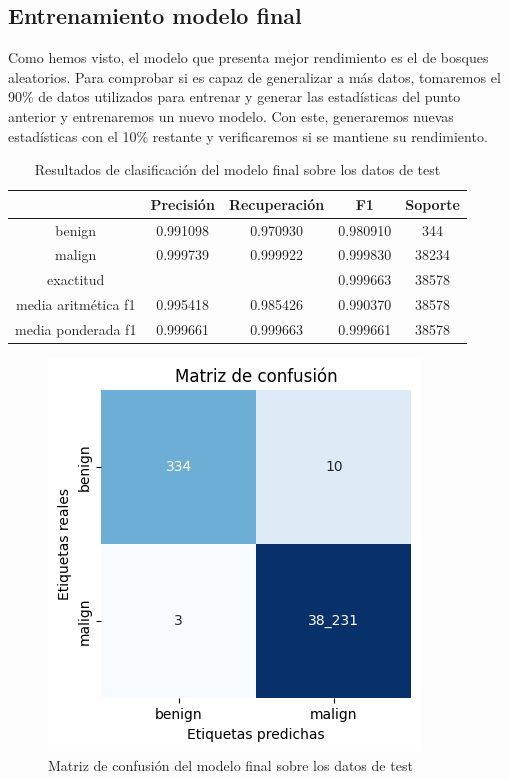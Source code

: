 \subsection{Entrenamiento modelo final}

Como hemos visto, el modelo que presenta mejor rendimiento es el de bosques aleatorios. Para comprobar si es capaz de generalizar a más datos, tomaremos el 90\% de datos utilizados para entrenar y generar las estadísticas del punto anterior y entrenaremos un nuevo modelo. Con este, generaremos nuevas estadísticas  con el 10\% restante y verificaremos si se mantiene su rendimiento.

\begin{table}[H]
    \begin{center}
        \begin{tabular}{|c | c c c | c |} 
            \hline
            & \textbf{Precisión} & \textbf{Recuperación} & \textbf{F1}  & \textbf{Soporte} \\
            \hline
            benign               & 0.991098 & 0.970930 & 0.980910  &   344 \\
            malign               & 0.999739 & 0.999922 & 0.999830  & 38234 \\
            \hline
            exactitud            &          &          & 0.999663  & 38578 \\
            media aritmética f1  & 0.995418 & 0.985426 & 0.990370  & 38578 \\
            media ponderada f1   & 0.999661 & 0.999663 & 0.999661  & 38578 \\
            \hline
        \end{tabular}
    \end{center}
    \caption{Resultados de clasificación del modelo final sobre los datos de test}
    \label{table:selectedresults}
\end{table}

\begin{figure}[H]
    \begin{center}
        \includegraphics[width=0.55\linewidth]{media/packet_pincer_train_model_random_forest_selected.png}
    \end{center}
    \caption{Matriz de confusión del modelo final sobre los datos de test}\label{fig:selectedmatrix}
\end{figure}

